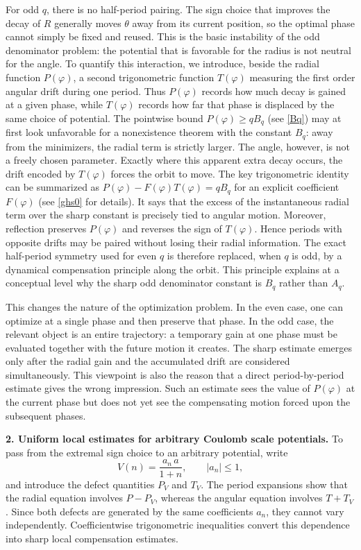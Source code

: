 \documentclass[12pt]{amsart}
\theoremstyle{plain}
\theoremstyle{definition}
\begin{document}
For odd $q$, there is no half-period pairing.  The sign choice that
improves the decay of $R$ generally moves $\theta$ away from its
current position, so the optimal phase cannot simply be fixed and
reused.  This is the basic instability of the odd denominator
problem: the potential that is favorable for the radius is not
neutral for the angle.
To quantify this interaction, we introduce, beside the radial
function $P(\varphi)$, a second trigonometric function $T(\varphi)$ measuring the
first order angular drift during one period.  Thus $P(\varphi)$ records how
much decay is gained at a given phase, while $T(\varphi)$ records how far that
phase is displaced by the same choice of potential.  The pointwise
bound $P(\varphi)\geq qB_q$ (see \eqref{Bq}) may at first look unfavorable for a
nonexistence theorem with the constant $B_q$: away from the
minimizers, the radial term is strictly larger.  The angle, however,
is not a freely chosen parameter.  Exactly where this apparent extra
decay occurs, the drift encoded by $T(\varphi)$ forces the orbit to move.
The key trigonometric identity can be summarized as
$P(\varphi)-F(\varphi)T(\varphi)=qB_q$ for an explicit coefficient
$F(\varphi)$ (see \eqref{ghs0} for details).  It says that the excess of the instantaneous radial
term over the sharp constant is precisely tied to angular motion.
Moreover, reflection preserves $P(\varphi)$ and reverses the sign of $T(\varphi)$.
Hence periods with opposite drifts may be paired without losing their
radial information.  The exact half-period symmetry used for even
$q$ is therefore replaced, when $q$ is odd, by a dynamical
compensation principle along the orbit.  This principle explains at
a conceptual level why the sharp odd denominator constant is $B_q$
rather than $A_q$.

This changes the nature of the optimization problem.  In the even
case, one can optimize at a single phase and then preserve that phase.
In the odd case, the relevant object is an entire trajectory: a
temporary gain at one phase must be evaluated together with the
future motion it creates.  The sharp estimate emerges only after the
radial gain and the accumulated drift are considered simultaneously.
This viewpoint is also the reason that a direct period-by-period
estimate gives the wrong impression.  Such an estimate sees the value
of $P(\varphi)$ at the current phase but does not yet see the compensating
motion forced upon the subsequent phases.

\medskip
\noindent\textbf{2. Uniform local estimates for arbitrary
	Coulomb scale potentials.}
To pass from the extremal sign choice to an arbitrary potential, write
\[
V(n)=\frac{a_n\,a}{1+n},
\qquad |a_n|\leq1,
\]
and introduce the defect quantities $P_V$ and $T_V$. The period
expansions show that the radial equation involves $P-P_V$, whereas the
angular equation involves $T+T_V$. Since both defects are generated by
the same coefficients $a_n$, they cannot vary independently.
Coefficientwise trigonometric inequalities convert this dependence
into sharp local compensation estimates.
\end{document}
